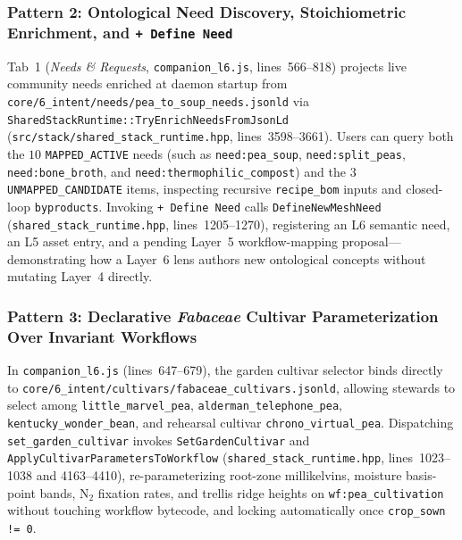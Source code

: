 \subsubsection{Pattern 2: Ontological Need Discovery, Stoichiometric Enrichment, and \texttt{+ Define Need}}
Tab~1 (\textit{Needs \& Requests}, \texttt{companion\_l6.js}, lines~566--818) projects live community needs enriched at daemon startup from \texttt{core/6\_intent/needs/pea\_to\_soup\_needs.jsonld} via \texttt{SharedStackRuntime::TryEnrichNeedsFromJsonLd} (\texttt{src/stack/shared\_stack\_runtime.hpp}, lines~3598--3661). Users can query both the $10$ \texttt{MAPPED\_ACTIVE} needs (such as \texttt{need:pea\_soup}, \texttt{need:split\_peas}, \texttt{need:bone\_broth}, and \texttt{need:thermophilic\_compost}) and the $3$ \texttt{UNMAPPED\_CANDIDATE} items, inspecting recursive \texttt{recipe\_bom} inputs and closed-loop \texttt{byproducts}. Invoking \texttt{+ Define Need} calls \texttt{DefineNewMeshNeed} (\texttt{shared\_stack\_runtime.hpp}, lines~1205--1270), registering an L6 semantic need, an L5 asset entry, and a pending Layer~5 workflow-mapping proposal---demonstrating how a Layer~6 lens authors new ontological concepts without mutating Layer~4 directly.

\subsubsection{Pattern 3: Declarative \textit{Fabaceae} Cultivar Parameterization Over Invariant Workflows}
In \texttt{companion\_l6.js} (lines~647--679), the garden cultivar selector binds directly to \texttt{core/6\_intent/cultivars/fabaceae\_cultivars.jsonld}, allowing stewards to select among \texttt{little\_marvel\_pea}, \texttt{alderman\_telephone\_pea}, \texttt{kentucky\_wonder\_bean}, and rehearsal cultivar \texttt{chrono\_virtual\_pea}. Dispatching \texttt{set\_garden\_cultivar} invokes \texttt{SetGardenCultivar} and \texttt{ApplyCultivarParametersToWorkflow} (\texttt{shared\_stack\_runtime.hpp}, lines~1023--1038 and 4163--4410), re-parameterizing root-zone millikelvins, moisture basis-point bands, $\mathrm{N}_2$ fixation rates, and trellis ridge heights on \texttt{wf:pea\_cultivation} without touching workflow bytecode, and locking automatically once \texttt{crop\_sown != 0}.

